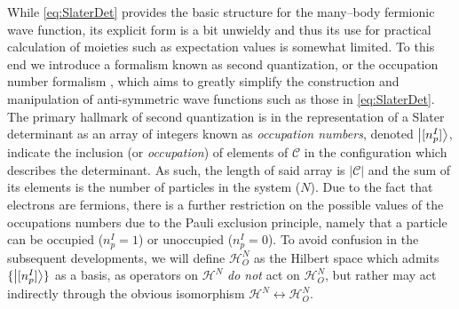 While \cref{eq:SlaterDet} provides the basic structure for the many--body fermionic wave function, its explicit form
is a bit unwieldy and thus its use for practical calculation of moieties such as expectation values is somewhat limited.
To this end we introduce a formalism known as second quantization, or the occupation number formalism \cite{Walecka12_book},
which aims to greatly simplify the construction and manipulation of anti-symmetric wave functions such as those in 
\cref{eq:SlaterDet}. The primary hallmark of second quantization is in the representation of a Slater determinant 
as an array of integers known as \emph{occupation numbers}, denoted $\left\vert [n_p^I] \right\rangle$, indicate the inclusion (or \emph{occupation}) of elements
of $\mathcal{C}$ in the configuration which describes the determinant. As such, the length of said array is $\vert \mathcal{C} \vert$
and the sum of its elements is the number of particles in the system ($N$). Due to the fact that electrons are fermions,
there is a further restriction on the possible values of the occupations numbers due to the Pauli exclusion principle,
namely that a particle can be occupied ($n^I_p=1$) or unoccupied ($n^I_p=0$). To avoid confusion in the subsequent developments,
we will define $\mathcal{H}^N_O$ as the Hilbert space which admits $\{\left\vert [n_p^I] \right\rangle\}$ as a basis, as operators on $\mathcal{H}^N$ 
\emph{do not} act on $\mathcal{H}^N_O$, but rather may act indirectly through the obvious isomorphism 
$\mathcal{H}^N \leftrightarrow \mathcal{H}^N_O$.

